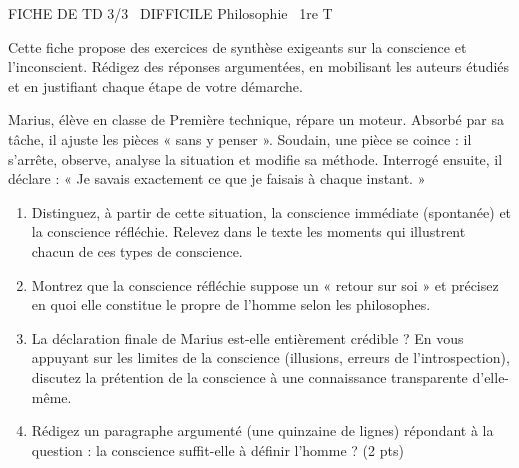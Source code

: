 \documentclass[11pt]{article}
\begin{document}
\begin{tcolorbox}[enhanced,colback=popink,colframe=popink,arc=10pt,boxrule=0pt,left=12pt,right=12pt,top=9pt,bottom=9pt]
{\color{white}\popxbold\small FICHE DE TD 3/3 \textbullet\ DIFFICILE \hfill Philosophie \textbullet\ 1re T\par}
\end{tcolorbox}
\vspace{4pt}
Cette fiche propose des exercices de synthèse exigeants sur la conscience et l'inconscient. Rédigez des réponses argumentées, en mobilisant les auteurs étudiés et en justifiant chaque étape de votre démarche.

\begin{exercice}
Marius, élève en classe de Première technique, répare un moteur. Absorbé par sa tâche, il ajuste les pièces « sans y penser ». Soudain, une pièce se coince : il s'arrête, observe, analyse la situation et modifie sa méthode. Interrogé ensuite, il déclare : « Je savais exactement ce que je faisais à chaque instant. »
\begin{enumerate}
\item Distinguez, à partir de cette situation, la conscience immédiate (spontanée) et la conscience réfléchie. Relevez dans le texte les moments qui illustrent chacun de ces types de conscience.
\item Montrez que la conscience réfléchie suppose un « retour sur soi » et précisez en quoi elle constitue le propre de l'homme selon les philosophes.
\item La déclaration finale de Marius est-elle entièrement crédible ? En vous appuyant sur les limites de la conscience (illusions, erreurs de l'introspection), discutez la prétention de la conscience à une connaissance transparente d'elle-même.
\item Rédigez un paragraphe argumenté (une quinzaine de lignes) répondant à la question : la conscience suffit-elle à définir l'homme ? (2 pts)
\end{enumerate}
\end{exercice}
\end{document}
